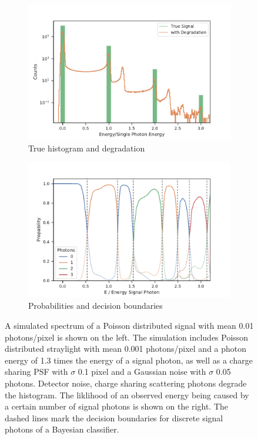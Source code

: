 \begin{figure}
	\centering
	\begin{subfigure}[b]{0.49\textwidth}
		\includegraphics[width=\linewidth]{images/sharing.pdf}
		\caption{True histogram and degradation}
		\label{fig:degrad}
	\end{subfigure}
	\begin{subfigure}[b]{0.49\textwidth}
		\includegraphics[width=\linewidth]{images/probs.pdf}
		\caption{Probabilities and decision boundaries}
		\label{fig:probs}
	\end{subfigure}
	
	\caption[Histogram, probabilities, and decision boundaries for the photon number under the influence of charge sharing and noise]{A simulated spectrum of a Poisson distributed signal with mean 0.01 photons/pixel is shown on the left.  The simulation includes Poisson distributed straylight with mean 0.001 photons/pixel and a photon energy of 1.3 times the energy of a signal photon, as well as a charge sharing PSF with $\sigma$ 0.1 pixel and a Gaussian noise with $\sigma$ 0.05 photons. Detector noise, charge sharing scattering photons degrade the histogram. The liklihood of an observed energy being caused by a certain number of signal photons is shown on the right. The dashed lines mark the decision boundaries for discrete signal photons of a Bayesian classifier.} 
\end{figure}


